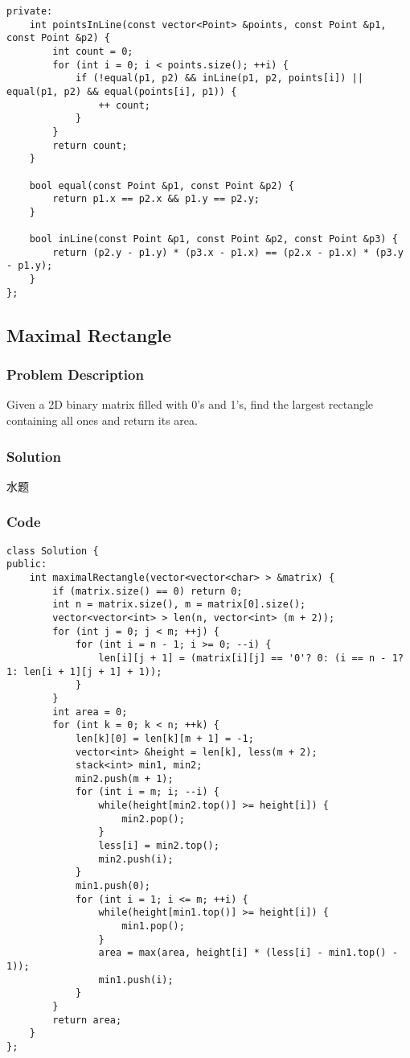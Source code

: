 \documentclass[courier]{article}
\begin{document}
\begin{CJK*}{UTF8}{gkai}
\begin{lstlisting}
private:
    int pointsInLine(const vector<Point> &points, const Point &p1, const Point &p2) {
        int count = 0;
        for (int i = 0; i < points.size(); ++i) {
            if (!equal(p1, p2) && inLine(p1, p2, points[i]) || equal(p1, p2) && equal(points[i], p1)) {
                ++ count;
            }
        }
        return count;
    }
    
    bool equal(const Point &p1, const Point &p2) {
        return p1.x == p2.x && p1.y == p2.y;
    }
    
    bool inLine(const Point &p1, const Point &p2, const Point &p3) {
        return (p2.y - p1.y) * (p3.x - p1.x) == (p2.x - p1.x) * (p3.y - p1.y);
    }
}; 
\end{lstlisting}


\subsection{ Maximal Rectangle }

\subsubsection*{Problem Description}
Given a 2D binary matrix filled with 0's and 1's, find the largest rectangle containing all ones and return its area.



\subsubsection*{Solution}
水题

\subsubsection*{Code}
\begin{lstlisting}
class Solution {
public:
    int maximalRectangle(vector<vector<char> > &matrix) {
        if (matrix.size() == 0) return 0;
        int n = matrix.size(), m = matrix[0].size();
        vector<vector<int> > len(n, vector<int> (m + 2));
        for (int j = 0; j < m; ++j) {
            for (int i = n - 1; i >= 0; --i) {
                len[i][j + 1] = (matrix[i][j] == '0'? 0: (i == n - 1? 1: len[i + 1][j + 1] + 1));
            }
        }
        int area = 0;
        for (int k = 0; k < n; ++k) {
            len[k][0] = len[k][m + 1] = -1;
            vector<int> &height = len[k], less(m + 2);
            stack<int> min1, min2;
            min2.push(m + 1);
            for (int i = m; i; --i) {
                while(height[min2.top()] >= height[i]) {
                    min2.pop();
                }
                less[i] = min2.top();
                min2.push(i);
            }
            min1.push(0);
            for (int i = 1; i <= m; ++i) {
                while(height[min1.top()] >= height[i]) {
                    min1.pop();
                }
                area = max(area, height[i] * (less[i] - min1.top() - 1));
                min1.push(i);
            }
        }
        return area;
    }
}; 
\end{lstlisting}



\end{CJK*}
\end{document}
